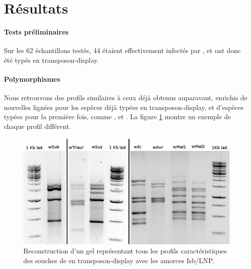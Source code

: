 \section{Résultats} %
\label{sec:résultats}

\paragraph{Tests préliminaires} %
\label{par:tests_pr_liminaires}
Sur les 62 échantillons testés, 44 étaient effectivement infectés par , et ont donc été typés en transposon-display.

\paragraph{Polymorphismes} %
\label{par:polymorphisme}
Nous retrouvons des profils similaires à ceux déjà obtenus auparavant\cite{memHH}, enrichis de nouvelles lignées pour les espèces déjà typées en transposon-display, et d'espèces typées pour la première fois, comme ,  et . %
La figure \ref{fig:profils} montre un exemple de chaque profil différent.

\begin{figure}[h]
	\begin{center}
		\includegraphics[width=150mm]{images/profils_crop.png}
	\end{center}
	\caption{Reconstruction d'un gel représentant tous les profils caractéristiques des souches de  en transposon-display avec les amorces Isb/LNP.}
	\label{fig:profils}
\end{figure}

